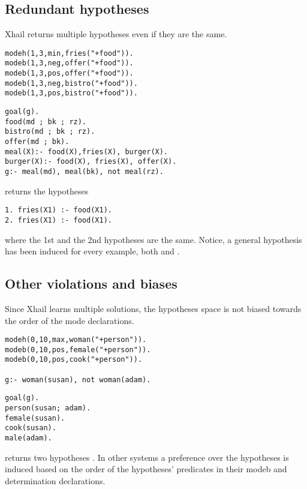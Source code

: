 \subsection{Redundant hypotheses}\label{xhail_redundant_hypotheses}
Xhail returns multiple hypotheses even if they are the same.

\begin{minipage}[t]{.43\textwidth}
\begin{lstlisting}
modeh(1,3,min,fries("+food")).
modeb(1,3,neg,offer("+food")).
modeb(1,3,pos,offer("+food")).
modeb(1,3,neg,bistro("+food")).
modeb(1,3,pos,bistro("+food")).
\end{lstlisting}
\end{minipage}
\begin{minipage}[t]{.20\textwidth}
\begin{lstlisting}
goal(g).
food(md ; bk ; rz).
bistro(md ; bk ; rz).
offer(md ; bk).
meal(X):- food(X),fries(X), burger(X).
burger(X):- food(X), fries(X), offer(X).
g:- meal(md), meal(bk), not meal(rz).
\end{lstlisting}
\end{minipage}

returns the hypotheses

\begin{lstlisting}
1. fries(X1) :- food(X1).
2. fries(X1) :- food(X1).
\end{lstlisting}
where the 1st and the 2nd hypotheses are the same. Notice, a general hypothesis has been induced for every example, both  and .

\subsection{Other violations and biases}
Since Xhail learns multiple solutions, the hypotheses space is not biased towards the order of the mode declarations.

\begin{minipage}[t]{.50\textwidth}
\begin{lstlisting}
modeh(0,10,max,woman("+person")).
modeb(0,10,pos,female("+person")).
modeb(0,10,pos,cook("+person")).

g:- woman(susan), not woman(adam).
\end{lstlisting}
\end{minipage}
\begin{minipage}[t]{.20\textwidth}
\begin{lstlisting}
goal(g).
person(susan; adam).
female(susan).
cook(susan).
male(adam).
\end{lstlisting}
\end{minipage}

returns two hypotheses
. In other systems a preference over the hypotheses is induced based on the order of the hypotheses' predicates  in their modeb and determination declarations.
